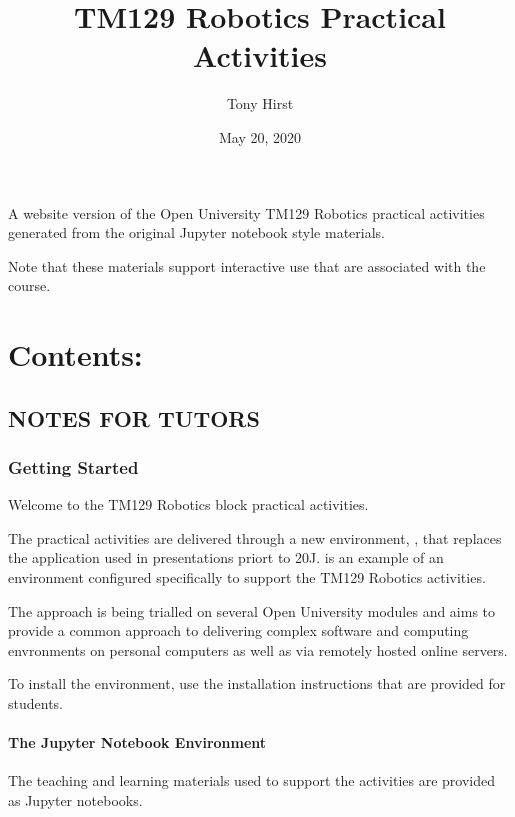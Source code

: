 \documentclass[letterpaper,10pt,english]{sphinxmanual}
\title{TM129 Robotics Practical Activities}
\date{May 20, 2020}
\author{Tony Hirst}
\begin{document}
\pagestyle{empty}
\sphinxmaketitle
\pagestyle{plain}
\sphinxtableofcontents
\pagestyle{normal}
\label{\detokenize{index::doc}}


A website version of the Open University TM129 Robotics practical activities generated
from the original Jupyter notebook style materials.

Note that these materials  support interactive use that are associated with the course.


\chapter{Contents:}
\label{\detokenize{index:contents}}

\section{NOTES FOR TUTORS}
\label{\detokenize{index:notes-for-tutors}}

\subsection{Getting Started}
\label{\detokenize{content/00_NOTES_FOR_TUTORS/GETTING_STARTED:Getting-Started}}\label{\detokenize{content/00_NOTES_FOR_TUTORS/GETTING_STARTED::doc}}
Welcome to the TM129 Robotics block practical activities.

The practical activities are delivered through a new environment, , that replaces the  application used in presentations priort to 20J.  is an example of an  environment configured specifically to support the TM129 Robotics activities.

The  approach is being trialled on several Open University modules and aims to provide a common approach to delivering complex software and computing envronments on personal computers as well as via remotely hosted online servers.

To install the environment, use the installation instructions that are provided for students.


\subsubsection{The Jupyter Notebook Environment}
\label{\detokenize{content/00_NOTES_FOR_TUTORS/GETTING_STARTED:The-Jupyter-Notebook-Environment}}
The teaching and learning materials used to support the activities are provided as Jupyter notebooks.
\end{document}
